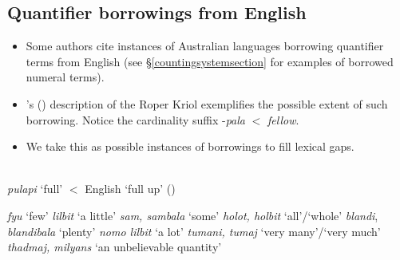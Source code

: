 \documentclass{article}
\begin{document}
\subsection{Quantifier borrowings from English}

\begin{itemize}
\item Some authors cite instances of Australian languages borrowing quantifier terms from English (see \S\ref{countingsystemsection} for examples of borrowed numeral terms).
\item \citeauthor{sandefur79}'s (\citeyear{sandefur79}) description of the Roper Kriol exemplifies the possible extent of such borrowing. Notice the cardinality suffix -\textit{pala} $<$ \textit{fellow}.
\item We take this as possible instances of borrowings to fill lexical gaps.
\end{itemize}

\begin{exe} 
   \\
  \textit{pulapi} `full' $<$ English `full up'
   (\citealt[100]{sandefur79})
  \begin{xlist}
    \ex \textit{fyu} `few'
    \ex \textit{lilbit} `a little'
    \ex \textit{sam, sambala} `some'
    \ex \textit{holot, holbit} `all'/`whole'
    \ex \textit{blandi}, \textit{blandibala} `plenty'
    \ex \textit{nomo lilbit} `a lot'
    \ex \textit{tumani, tumaj} `very many'/`very much'
    \ex \textit{thadmaj, milyans} `an unbelievable quantity'
  \end{xlist}
\end{exe}
\end{document}

